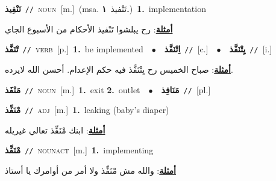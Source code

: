 \documentclass[10pt,a4paper,twoside]{article} %
\begin{document}
\begin{multicols}{2}
{\setlength\topsep{0pt}\textbf{\foreignlanguage{arabic}{تَنْفِيذ}}\ {\color{gray}\texttt{//}\color{black}}\ \textsc{noun}\ [m.]\ \color{gray}(msa. \foreignlanguage{arabic}{تَنْفيذ}~\foreignlanguage{arabic}{\textbf{١.}})\color{black}\ \textbf{1.}~implementation\  \begin{flushright}\color{gray}\foreignlanguage{arabic}{\textbf{\underline{\foreignlanguage{arabic}{أمثلة}}}: رح يبلشوا تَنْفيذ الأحكام من الأسبوع الجاي}\end{flushright}\color{black}} \vspace{2mm}

{\setlength\topsep{0pt}\textbf{\foreignlanguage{arabic}{تْنَفَّذ}}\ {\color{gray}\texttt{//}\color{black}}\ \textsc{verb}\ [p.]\ \textbf{1.}~be implemented\ \ $\bullet$\ \ \setlength\topsep{0pt}\textbf{\foreignlanguage{arabic}{اِتْنَفَّذ}}\ {\color{gray}\texttt{//}\color{black}}\ [c.]\ \ $\bullet$\ \ \setlength\topsep{0pt}\textbf{\foreignlanguage{arabic}{يِتْنَفَّذ}}\ {\color{gray}\texttt{//}\color{black}}\ [i.]\  \begin{flushright}\color{gray}\foreignlanguage{arabic}{\textbf{\underline{\foreignlanguage{arabic}{أمثلة}}}: صباح الخميس رح يِتْنَفَّذ فيه حكم الإعدام. أحسن الله لايرده.}\end{flushright}\color{black}} \vspace{2mm}

{\setlength\topsep{0pt}\textbf{\foreignlanguage{arabic}{مَنْفَذ}}\ {\color{gray}\texttt{//}\color{black}}\ \textsc{noun}\ [m.]\ \textbf{1.}~exit  \textbf{2.}~outlet\ \ $\bullet$\ \ \setlength\topsep{0pt}\textbf{\foreignlanguage{arabic}{مَنَافِذ}}\ {\color{gray}\texttt{//}\color{black}}\ [pl.]\ } \vspace{2mm}

{\setlength\topsep{0pt}\textbf{\foreignlanguage{arabic}{مْنَفِّذ}}\ {\color{gray}\texttt{//}\color{black}}\ \textsc{adj}\ [m.]\ \textbf{1.}~leaking (baby's diaper)\  \begin{flushright}\color{gray}\foreignlanguage{arabic}{\textbf{\underline{\foreignlanguage{arabic}{أمثلة}}}: ابنك مْنَفِّذ تعالي غيريله}\end{flushright}\color{black}} \vspace{2mm}

{\setlength\topsep{0pt}\textbf{\foreignlanguage{arabic}{مْنَفِّذ}}\ {\color{gray}\texttt{//}\color{black}}\ \textsc{noun\textunderscore act}\ [m.]\ \textbf{1.}~implementing\  \begin{flushright}\color{gray}\foreignlanguage{arabic}{\textbf{\underline{\foreignlanguage{arabic}{أمثلة}}}: والله مش مْنَفِّذ ولا أمر من أوامرك يا أستاذ}\end{flushright}\color{black}} \vspace{2mm}


\end{multicols}
\end{document}
